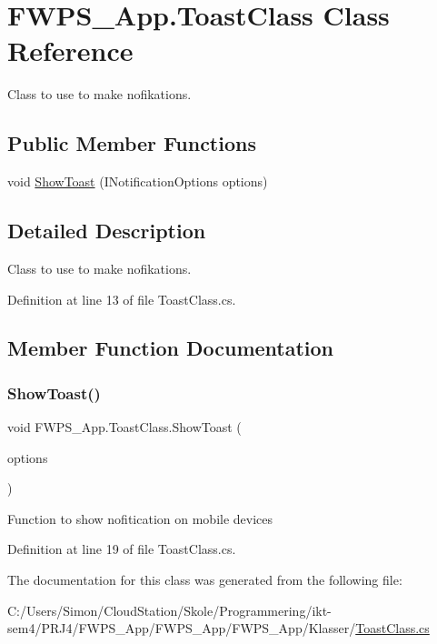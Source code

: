 \hypertarget{class_f_w_p_s___app_1_1_toast_class}{}\section{F\+W\+P\+S\+\_\+\+App.\+Toast\+Class Class Reference}
\label{class_f_w_p_s___app_1_1_toast_class}


Class to use to make nofikations.  


\subsection*{Public Member Functions}
\begin{DoxyCompactItemize}
\item 
void \mbox{\hyperlink{class_f_w_p_s___app_1_1_toast_class_a9629fdf2b59d0fd2e9a6f5dd34b794a9}{Show\+Toast}} (I\+Notification\+Options options)
\end{DoxyCompactItemize}


\subsection{Detailed Description}
Class to use to make nofikations. 

Definition at line 13 of file Toast\+Class.\+cs.



\subsection{Member Function Documentation}
\mbox{\label{class_f_w_p_s___app_1_1_toast_class_a9629fdf2b59d0fd2e9a6f5dd34b794a9}} 
\subsubsection{\texorpdfstring{Show\+Toast()}{ShowToast()}}
{\footnotesize\ttfamily void F\+W\+P\+S\+\_\+\+App.\+Toast\+Class.\+Show\+Toast (\begin{DoxyParamCaption}\item[{I\+Notification\+Options}]{options }\end{DoxyParamCaption})}

Function to show nofitication on mobile devices 

Definition at line 19 of file Toast\+Class.\+cs.



The documentation for this class was generated from the following file\+:\begin{DoxyCompactItemize}
\item 
C\+:/\+Users/\+Simon/\+Cloud\+Station/\+Skole/\+Programmering/ikt-\/sem4/\+P\+R\+J4/\+F\+W\+P\+S\+\_\+\+App/\+F\+W\+P\+S\+\_\+\+App/\+F\+W\+P\+S\+\_\+\+App/\+Klasser/\mbox{\hyperlink{_toast_class_8cs}{Toast\+Class.\+cs}}\end{DoxyCompactItemize}
